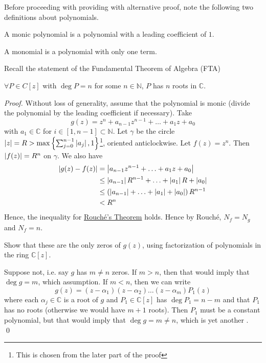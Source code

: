 \documentclass[11pt, oneside]{book}
\begin{document}
Before proceeding with providing with alternative proof, note the following two definitions about polynomials.

\begin{defn}\label{defn:monic_polynomial}
  A monic polynomial is a polynomial with a leading coefficient of $1$.
\end{defn}

\begin{defn}\label{defn:monomial}
  A monomial is a polynomial with only one term.
\end{defn}

Recall the statement of the Fundamental Theorem of Algebra (FTA)

$\forall P \in C[z]$ with $\deg P = n$ for some $n \in \mathbb{N}$, $P$ has $n$ roots in $\mathbb{C}$.

\begin{proof}
  Without loss of generality, assume that the polynomial is monic (divide the polynomial by the leading coefficient if necessary). Take
  \begin{equation*}
    g(z) = z^n + a_{n - 1}z^{n - 1} + \hdots + a_1 z + a_0
  \end{equation*}
  with $a_1 \in \mathbb{C}$ for $i \in [1, n - 1] \subset \mathbb{N}$. Let $\gamma$ be the circle $\left|z\right| = R > \max\left\{\sum_{j=0}^{n-1} \left|a_j\right|, 1 \right\}$\footnote{This is chosen from the later part of the proof}, oriented anticlockwise. Let $f(z) = z^n$. Then $\left|f(z)\right| = R^n$ on $\gamma$. We also have
  \begin{align*}
    \left|g(z) - f(z)\right|
      &= \left|a_{n - 1} z^{n - 1} + \hdots + a_1 z + a_0\right| \\
      &\leq \left|a_{n-1}\right| R^{n - 1} + \hdots + \left|a_1\right| R + \left|a_0\right| \\
      &\leq \left( \left|a_{n-1}\right| + \hdots + \left|a_1\right| + \left|a_0\right| \right) R^{n - 1} \\
      &< R^n
  \end{align*}
  Hence, the inequality for \hyperref[thm:rouche_s_theorem]{Rouch\'e's Theorem} holds. Hence by Rouch\'e, $N_f = N_g$ and $N_f = n$.

  \textit{} Show that these are the only zeros of $g(z)$, using factorization of polynomials in the ring $\mathbb{C}[z]$.

  Suppose not, i.e. say $g$ has $m \neq n$ zeros. If $m > n$, then that would imply that $\deg g = m$, which \Lightning assumption. If $m < n$, then we can write
  \begin{equation*}
    g(z) = (z - \alpha_1)(z - \alpha_2) \hdots (z - \alpha_m) P_1(z)
  \end{equation*}
  where each $\alpha_j \in \mathbb{C}$ is a root of $g$ and $P_1 \in \mathbb{C} [z]$ has $\deg P_1 = n - m$ and that $P_1$ has no roots (otherwise we would have $m + 1$ roots). Then $P_1$ must be a constant polynomial, but that would imply that $\deg g = m \neq n$, which is yet another \Lightning. \qed
\end{proof}
\end{document}
